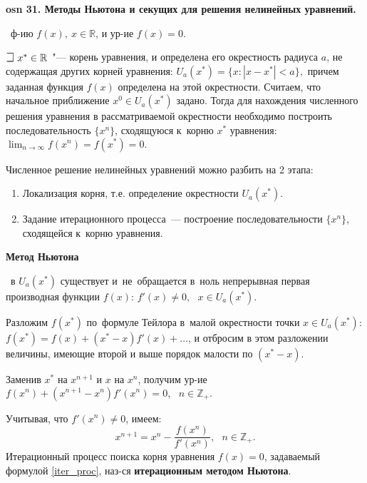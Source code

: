 \setcounter{section}{15}
\setcounter{subsection}{31}
\setcounter{equation}{0}
\textbf{\LARGE osn 31. Методы Ньютона и секущих для решения нелинейных уравнений.}



\faEye \ ф-ию $f(x), ~x\in \mathbb{R}$, и ур-ие $f(x)=0.$

$\mathLet ~ x^* \in \mathbb{R}$~"--- корень уравнения, и определена его
окрестность радиуса $a$, не содержащая других корней уравнения: 
$U_a(x^*)=\{x:|x-x^*| < a\},$
причем заданная функция $f(x)$ определена на этой окрестности.
Считаем, что начальное приближение $x^0 \in U_a(x^*)$ задано.
Тогда для нахождения численного решения уравнения в
рассматриваемой окрестности необходимо построить последовательность
$\{x^n\}$, сходящуюся к~корню $x^*$ уравнения:
$\lim_{n\rightarrow\infty}f(x^n) = f(x^*) = 0.$
    
Численное решение нелинейных уравнений можно разбить на 2 этапа:
\begin{enumerate}
    \item Локализация корня, т.е. определение окрестности $U_a(x^*)$.
    \item Задание итерационного процесса~— построение последовательности
    $\{x^n\}$, сходящейся к~корню уравнения.
\end{enumerate}

\centerline{\textbf{Метод Ньютона}}

\mathLet \ в $U_a(x^*)$ существует и~не~обращается в~ноль непрерывная
первая производная функции $f(x)$: $f'(x) \neq 0,~~~x\in U_a(x^*).$

Разложим $f(x^*)$ по~формуле Тейлора в~малой окрестности точки $x\in U_a(x^*)$:
$f(x^*) =  f(x) + (x^* - x)f'(x) + \dots$, 
и отбросим в этом разложении величины, имеющие второй и выше порядок малости
по $(x^* - x)$.

Заменив $x^*$ на $x^{n+1}$ и $x$ на $x^n$, получим ур-ие 
$ f(x^n) + (x^{n + 1} - x^n)f'(x^n) = 0,~~~n\in \mathbb{Z}_+.$

Учитывая, что $f'(x^n) \neq 0$, имеем:
%
    \begin{equation}
        \label{iter_proc}
        x^{n + 1} = x^n - \frac{f(x^n)}{f'(x^n)},~~~n \in \mathbb{Z}_+.
    \end{equation}
%
Итерационный процесс поиска корня уравнения $f(x)=0$, задаваемый формулой \eqref{iter_proc},
наз-ся \textbf{итерационным методом Ньютона}.

